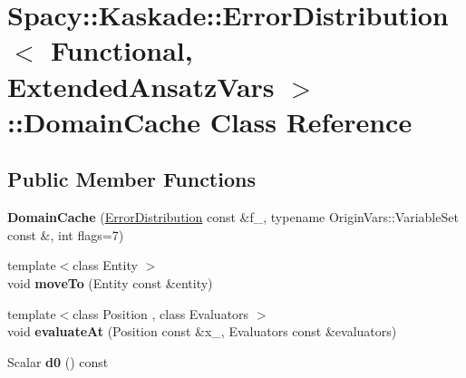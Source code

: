 \hypertarget{classSpacy_1_1Kaskade_1_1ErrorDistribution_1_1DomainCache}{}\section{Spacy\+:\+:Kaskade\+:\+:Error\+Distribution$<$ Functional, Extended\+Ansatz\+Vars $>$\+:\+:Domain\+Cache Class Reference}
\label{classSpacy_1_1Kaskade_1_1ErrorDistribution_1_1DomainCache}
\subsection*{Public Member Functions}
\begin{DoxyCompactItemize}
\item 
\hypertarget{classSpacy_1_1Kaskade_1_1ErrorDistribution_1_1DomainCache_a4d795bf827e132c749bf187a898e0cae}{}{\bfseries Domain\+Cache} (\hyperlink{classSpacy_1_1Kaskade_1_1ErrorDistribution}{Error\+Distribution} const \&f\+\_\+, typename Origin\+Vars\+::\+Variable\+Set const \&, int flags=7)\label{classSpacy_1_1Kaskade_1_1ErrorDistribution_1_1DomainCache_a4d795bf827e132c749bf187a898e0cae}

\item 
\hypertarget{classSpacy_1_1Kaskade_1_1ErrorDistribution_1_1DomainCache_a92c3a6e34c52903f5beb0c74228e3564}{}{\footnotesize template$<$class Entity $>$ }\\void {\bfseries move\+To} (Entity const \&entity)\label{classSpacy_1_1Kaskade_1_1ErrorDistribution_1_1DomainCache_a92c3a6e34c52903f5beb0c74228e3564}

\item 
\hypertarget{classSpacy_1_1Kaskade_1_1ErrorDistribution_1_1DomainCache_ae554faae1e9ec499b26194ddd3bdc522}{}{\footnotesize template$<$class Position , class Evaluators $>$ }\\void {\bfseries evaluate\+At} (Position const \&x\+\_\+, Evaluators const \&evaluators)\label{classSpacy_1_1Kaskade_1_1ErrorDistribution_1_1DomainCache_ae554faae1e9ec499b26194ddd3bdc522}

\item 
\hypertarget{classSpacy_1_1Kaskade_1_1ErrorDistribution_1_1DomainCache_a69892afb6c248b274005e99f514388c8}{}Scalar {\bfseries d0} () const \label{classSpacy_1_1Kaskade_1_1ErrorDistribution_1_1DomainCache_a69892afb6c248b274005e99f514388c8}


\end{DoxyCompactItemize}
